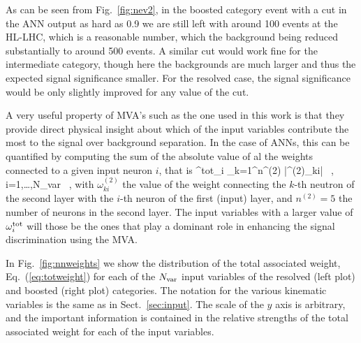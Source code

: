As can be seen from Fig.~\ref{fig:nev2}, in the boosted category
event with a cut in the ANN output as hard as 0.9 we are still left
with around 100 events at the HL-LHC, which is a reasonable number,
which the background being reduced substantially to around
500 events.
%
A similar cut would work fine for the intermediate category, though here
the backgrounds are much larger and thus the expected signal significance smaller.
%
For the resolved case, the signal significance would be only slightly
improved for any value of the cut.

A very useful property of MVA's such as the one used in this work
is that they provide direct  physical insight about which of the
input variables contribute the most to the signal over background
separation.
%
In the case of ANNs, this can be quantified by computing the sum
of the absolute value of al the weights connected to a given
input neuron $i$, that is
\be
\label{eq:totweight}
\omega^{\rm tot}_i \equiv \sum_{k=1}^{n^{(2)}} \Big|\omega^{(2)}_{ki}\Big| \, ,
\qquad i=1,\ldots,N_{\rm var} \, ,
\ee
with $\omega^{(2)}_{ki}$ the value of the weight connecting
the $k$-th neutron of the second layer with the $i$-th neuron of
the first (input) layer, and $n^{(2)}=5$ the number of
neurons in the second layer.
%
The input variables with a larger value of $\omega^{\rm tot}_i$ will those
be the ones that play a dominant role in enhancing the signal
discrimination using the MVA.

%
In Fig.~\ref{fig:nnweights} we show
the distribution of the total associated weight,
Eq.~(\ref{eq:totweight}) for each of the $N_{\rm var}$ input
variables of the resolved (left plot) and boosted (right plot) categories.
%
The notation for the various kinematic variables is the same
as in Sect.~\ref{sec:input}.
%
The scale of the $y$ axis is arbitrary, and the important information
is contained in the relative strengths of the total associated weight
for each of the input variables.



